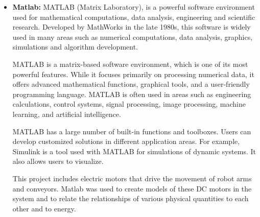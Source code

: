 \begin{itemize}
    \item \textbf{Matlab:} MATLAB (Matrix Laboratory), is a powerful software environment used for mathematical computations, data analysis, engineering and scientific research. Developed by MathWorks in the late 1980s, this software is widely used in many areas such as numerical computations, data analysis, graphics, simulations and algorithm development.

MATLAB is a matrix-based software environment, which is one of its most powerful features. While it focuses primarily on processing numerical data, it offers advanced mathematical functions, graphical tools, and a user-friendly programming language. MATLAB is often used in areas such as engineering calculations, control systems, signal processing, image processing, machine learning, and artificial intelligence.

MATLAB has a large number of built-in functions and toolboxes. Users can develop customized solutions in different application areas. For example, Simulink is a tool used with MATLAB for simulations of dynamic systems. It also allows users to visualize.

This project includes electric motors that drive the movement of robot arms and conveyors. Matlab was used to create models of these DC motors in the system and to relate the relationships of various physical quantities to each other and to energy.
\end{itemize}

